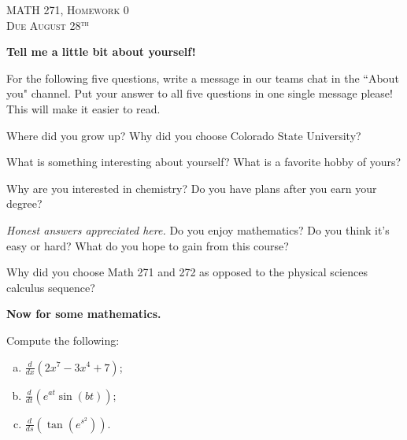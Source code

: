 \documentclass[12pt]{article} %
\begin{document}
\begin{center}
   \textsc{\large MATH 271, Homework 0}\\
   \textsc{Due August 28$^\textrm{th}$}
\end{center}

\begin{center}
    \textbf{Tell me a little bit about yourself!}
\end{center}

\noindent For the following five questions, write a message in our teams chat in the ``About you" channel.  Put your answer to all five questions in one single message please! This will make it easier to read.

\begin{question}
    Where did you grow up? Why did you choose Colorado State University?
\end{question}

\begin{question}
    What is something interesting about yourself?  What is a favorite hobby of yours?
\end{question}

\begin{question}
    Why are you interested in chemistry? Do you have plans after you earn your degree?
\end{question}

\begin{question}
    \emph{Honest answers appreciated here.}  Do you enjoy mathematics? Do you think it's easy or hard? What do you hope to gain from this course?
\end{question}

\begin{question}
    Why did you choose Math 271 and 272 as opposed to the physical sciences calculus sequence?
\end{question}


\begin{center}
    \textbf{Now for some mathematics.}
\end{center}

\begin{problem}
    Compute the following:
\begin{enumerate}[(a)]
    \item $\displaystyle{\frac{d}{dx}(2x^7-3x^4+7)}$;
    \item $\displaystyle{\frac{d}{dt}\left(e^{at}\sin(bt)\right)}$;
    \item $\displaystyle{\frac{d}{ds}\left(\tan\left( e^{s^2}\right)\right)}$.
\end{enumerate}
\end{problem}
\end{document}
